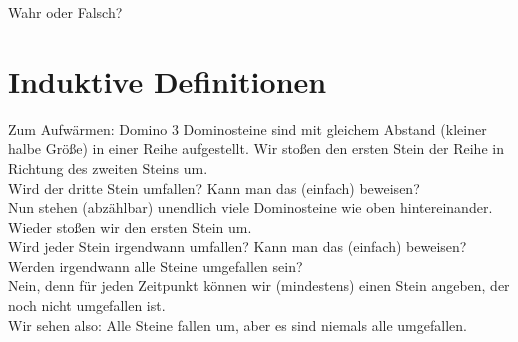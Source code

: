 \begin{frame}
	\begin{block}{Wahr oder Falsch?}
		\begin{itemize}
		\end{itemize}
	\end{block}

\end{frame}

\section{Induktive Definitionen}

\begin{frame}{Zum Aufwärmen: Domino}
	3 Dominosteine sind mit gleichem Abstand (kleiner halbe Größe) in einer Reihe aufgestellt. Wir stoßen den ersten Stein der Reihe in Richtung des zweiten Steins um. \\
	Wird der dritte Stein umfallen? Kann man das (einfach) beweisen? \\[1em]
	\pause
	Nun stehen (abzählbar) unendlich viele Dominosteine wie oben hintereinander. Wieder stoßen wir den ersten Stein um. \\
	Wird jeder Stein irgendwann umfallen? Kann man das (einfach) beweisen? \\[1em]
	\pause
	Werden irgendwann alle Steine umgefallen sein? \\
	\pause Nein, denn für jeden Zeitpunkt können wir (mindestens) einen Stein angeben, der noch nicht umgefallen ist.\\
	Wir sehen also: Alle Steine fallen um, aber es sind niemals alle umgefallen.
\end{frame}

